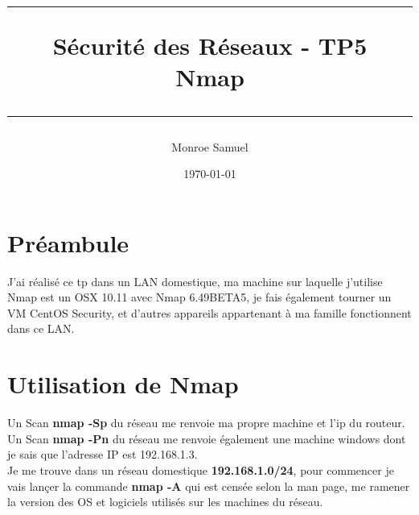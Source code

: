 \documentclass[a4paper,10pt,final,fleqn]{article}
\title{
\parbox{15cm}
{ %
  \vspace{3cm}
	\begin{center}\sf\bfseries\Huge
		\rule{15cm}{1pt}
		\medskip
		Sécurité des Réseaux - TP5 \\
		\huge Nmap
		\vspace{.5cm}
		\rule{15cm}{1pt}
	\end{center}
	\vspace{3cm}
 }}
\author{Monroe Samuel}
\date{\today}
\begin{document}
\maketitle
\newpage

	\section{Préambule}

		J'ai réalisé ce tp dans un LAN domestique, ma machine sur laquelle j'utilise Nmap est un OSX 10.11 avec Nmap 6.49BETA5, je fais également tourner un VM CentOS Security, et d'autres appareils appartenant à ma famille fonctionnent dans ce LAN.\\

	\section{Utilisation de Nmap}

		Un Scan \textbf{nmap -Sp} du réseau me renvoie ma propre machine et l'ip du routeur.\\

		Un Scan \textbf{nmap -Pn} du réseau me renvoie également une machine windows dont je sais que l'adresse IP est 192.168.1.3.\\

		Je me trouve dans un réseau domestique \textbf{192.168.1.0/24}, pour commencer je vais lançer la commande \textbf{nmap -A} qui est censée selon la man page, me ramener la version des OS et logiciels utilisés sur les machines du réseau.\\
\end{document}
